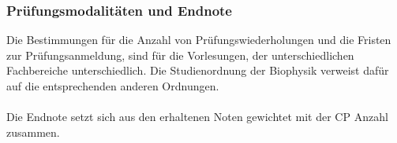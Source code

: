 \subsubsection{Prüfungsmodalitäten und Endnote}
Die Bestimmungen für die Anzahl von Prüfungswiederholungen und die Fristen zur Prüfungsanmeldung, sind für die Vorlesungen, der unterschiedlichen Fachbereiche unterschiedlich. 
Die Studienordnung der Biophysik verweist dafür auf die entsprechenden anderen Ordnungen. \\
\bigskip\\
%
Die Endnote setzt sich aus den erhaltenen Noten gewichtet mit der CP Anzahl zusammen.
 


